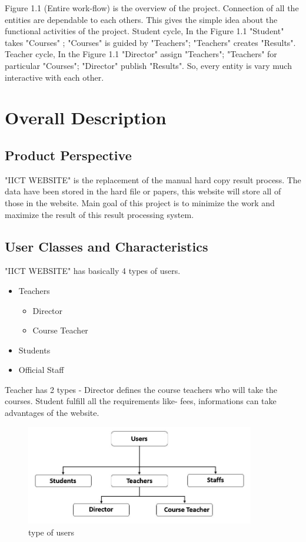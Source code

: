 \documentclass{scrreprt}
\begin{document}
\newline
Figure 1.1 (Entire work-flow) is the overview of the project. Connection of all the entities are dependable to each others.  This gives the simple idea about the functional activities of the project. 
\newline
Student cycle, In the Figure 1.1 "Student" takes "Courses" ; "Courses" is guided by "Teachers"; "Teachers" creates "Results". 
\newline
Teacher cycle, In the Figure 1.1 "Director" assign "Teachers"; "Teachers" for particular "Courses"; "Director" publish "Results".
\newline
So, every entity is vary much interactive with each other.


\chapter{Overall Description}

\section{Product Perspective}
"IICT WEBSITE" is the replacement of the manual hard copy result process. The data have been stored in the hard file or papers, this website will store all of those in the website. Main goal of this project is to minimize the work and maximize the result of this result processing system.

\section{User Classes and Characteristics}
"IICT WEBSITE" has basically 4 types of users. 
\begin{itemize}
  \item Teachers
    \begin{itemize}
        \item Director
        \item Course Teacher
    \end{itemize}
  \item Students
  \item Official Staff
\end{itemize}
Teacher has 2 types - Director defines the course teachers who will take the courses. Student fulfill all the requirements like- fees, informations can take advantages of the website. 
\begin{figure}
    \centering
    \includegraphics[width=10cm]{2.JPG}
    \caption{type of users}
    \label{fig:type of users}
\end{figure}
\end{document}
